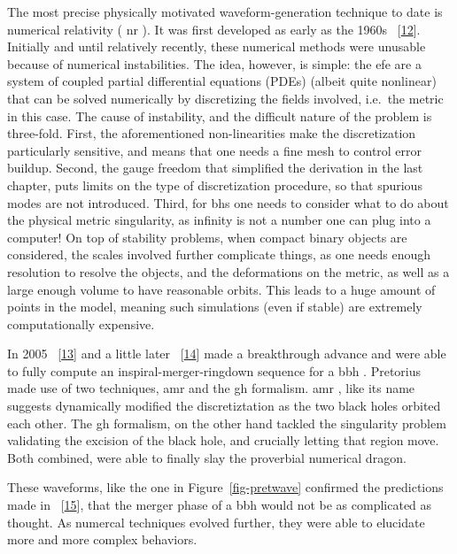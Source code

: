\documentclass[
  10pt,
  a4paper,
  DIV=11,
  numbers=noendperiod,
  oneside]{scrreprt}
\DeclareRobustCommand{\[}{\begin{equation}}
\DeclareRobustCommand{\]}{\end{equation}}
\begin{document}
The most precise physically motivated waveform-generation technique to
date is numerical relativity ( \gls{nr} ). It was first developed as
early as the 1960s ~{[}\protect\hyperlink{ref-hahn:1964}{12}{]}.
Initially and until relatively recently, these numerical methods were
unusable because of numerical instabilities. The idea, however, is
simple: the \gls{efe} are a system of coupled partial differential
equations (PDEs) (albeit quite nonlinear) that can be solved numerically
by discretizing the fields involved, i.e.~the metric in this case. The
cause of instability, and the difficult nature of the problem is
three-fold. First, the aforementioned non-linearities make the
discretization particularly sensitive, and means that one needs a fine
mesh to control error buildup. Second, the gauge freedom that simplified
the derivation in the last chapter, puts limits on the type of
discretization procedure, so that spurious modes are not introduced.
Third, for \glspl{bh} one needs to consider what to do about the
physical metric singularity, as infinity is not a number one can plug
into a computer! On top of stability problems, when compact binary
objects are considered, the scales involved further complicate things,
as one needs enough resolution to resolve the objects, and the
deformations on the metric, as well as a large enough volume to have
reasonable orbits. This leads to a huge amount of points in the model,
meaning such simulations (even if stable) are extremely computationally
expensive.

In 2005 ~{[}\protect\hyperlink{ref-Pretorius:2005gq}{13}{]} and a little
later ~{[}\protect\hyperlink{ref-Campanelli:2005dd}{14}{]} made a
breakthrough advance and were able to fully compute an
inspiral-merger-ringdown sequence for a \gls{bbh} . Pretorius made use
of two techniques, \gls{amr} and the \gls{gh} formalism. \gls{amr} ,
like its name suggests dynamically modified the discretiztation as the
two black holes orbited each other. The \gls{gh} formalism, on the other
hand tackled the singularity problem validating the excision of the
black hole, and crucially letting that region move. Both combined, were
able to finally slay the proverbial numerical dragon.

These waveforms, like the one in Figure~\ref{fig-pretwave} confirmed the
predictions made in ~{[}\protect\hyperlink{ref-Buonanno:2000ef}{15}{]},
that the merger phase of a \gls{bbh} would not be as complicated as
thought. As numercal techniques evolved further, they were able to
elucidate more and more complex behaviors.
\end{document}
